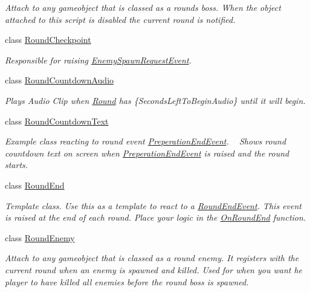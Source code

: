 \begin{DoxyCompactItemize}
\begin{DoxyCompactList}\small\item\em Attach to any gameobject that is classed as a rounds boss. When the object attached to this script is disabled the current round is notified. \end{DoxyCompactList}\item 
class \hyperlink{class_round_manager_1_1_round_checkpoint}{Round\+Checkpoint}
\begin{DoxyCompactList}\small\item\em Responsible for raising \hyperlink{class_round_manager_1_1_events_1_1_enemy_spawn_request_event}{Enemy\+Spawn\+Request\+Event}. \end{DoxyCompactList}\item 
class \hyperlink{class_round_manager_1_1_round_countdown_audio}{Round\+Countdown\+Audio}
\begin{DoxyCompactList}\small\item\em Plays Audio Clip when \hyperlink{class_round_manager_1_1_round}{Round} has \{Seconds\+Left\+To\+Begin\+Audio\} until it will begin. \end{DoxyCompactList}\item 
class \hyperlink{class_round_manager_1_1_round_countdown_text}{Round\+Countdown\+Text}
\begin{DoxyCompactList}\small\item\em Example class reacting to round event \hyperlink{class_round_manager_1_1_events_1_1_preperation_end_event}{Preperation\+End\+Event}. ~\newline
Shows round countdown text on screen when \hyperlink{class_round_manager_1_1_events_1_1_preperation_end_event}{Preperation\+End\+Event} is raised and the round starts. \end{DoxyCompactList}\item 
class \hyperlink{class_round_manager_1_1_round_end}{Round\+End}
\begin{DoxyCompactList}\small\item\em Template class. Use this as a template to react to a \hyperlink{class_round_manager_1_1_events_1_1_round_end_event}{Round\+End\+Event}. This event is raised at the end of each round. Place your logic in the \hyperlink{class_round_manager_1_1_round_end_a2f1efb5894088f4349f8bcb5eca3ca1f}{On\+Round\+End} function. \end{DoxyCompactList}\item 
class \hyperlink{class_round_manager_1_1_round_enemy}{Round\+Enemy}
\begin{DoxyCompactList}\small\item\em Attach to any gameobject that is classed as a round enemy. It registers with the current round when an enemy is spawned and killed. Used for when you want he player to have killed all enemies before the round boss is spawned. \end{DoxyCompactList}\item 

\end{DoxyCompactItemize}
